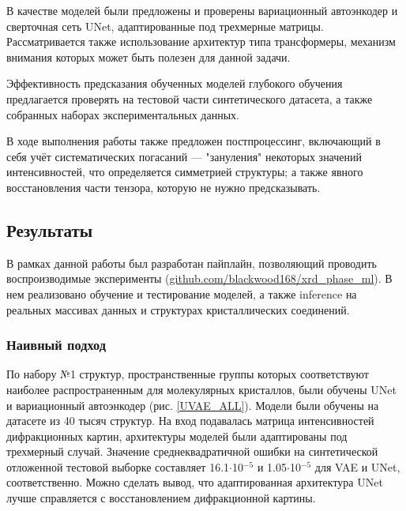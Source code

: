 \documentclass[a4paper,12pt]{article}
\begin{document}
{В качестве моделей были предложены и проверены вариационный автоэнкодер и сверточная сеть UNet, адаптированные под трехмерные матрицы. Рассматривается также использование архитектур типа трансформеры, механизм внимания которых может быть полезен для данной задачи.

Эффективность предсказания обученных моделей глубокого обучения предлагается проверять на тестовой части синтетического датасета, а также собранных наборах экспериментальных данных.

В ходе выполнения работы также предложен постпроцессинг, включающий в себя учёт систематических погасаний --- "зануления" некоторых значений интенсивностей, что определяется симметрией структуры; а также явного восстановления части тензора, которую не нужно предсказывать.


\subsection*{Результаты}

В рамках данной работы был разработан пайплайн, позволяющий проводить воспроизводимые эксперименты (\url{github.com/blackwood168/xrd_phase_ml}). В нем реализовано обучение и тестирование моделей, а также inference на реальных массивах данных и структурах кристаллических соединений.


\subsubsection*{Наивный подход}

По набору №1 структур, пространственные группы которых соответствуют наиболее распространенным для молекулярных кристаллов, были обучены UNet и вариационный автоэнкодер (рис. \ref{UVAE_ALL}). Модели были обучены на датасете из 40 тысяч структур. На вход подавалась матрица интенсивностей дифракционных картин, архитектуры моделей были адаптированы под трехмерный случай. Значение среднеквадратичной ошибки на синтетической отложенной тестовой выборке составляет 16.1$\cdot$10$^{-5}$ и 1.05$\cdot$10$^{-5}$ для VAE и UNet, соответственно. Можно сделать вывод, что адаптированная архитектура UNet лучше справляется с восстановлением дифракционной картины.

}
\end{document}
